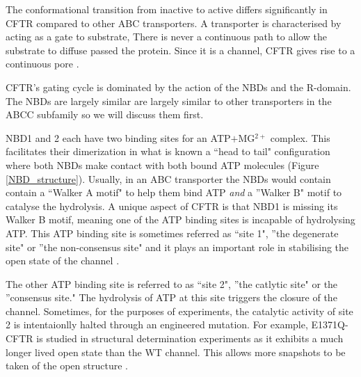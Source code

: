 The conformational transition from inactive to active differs significantly in CFTR compared to other ABC transporters. A transporter is characterised by acting as a gate to substrate, There is never a continuous path to allow the substrate to diffuse passed the protein. Since it is a channel, CFTR gives rise to a continuous pore \cite{linsdell2018}. 

CFTR's gating cycle is dominated by the action of the NBDs and the R-domain. The NBDs are largely similar are largely similar to other transporters in the ABCC subfamily so we will discuss them first. 

NBD1 and 2 each have two binding sites for an ATP$+$MG$^{2+}$ complex. This facilitates their dimerization in what is known a ``head to tail" configuration where both NBDs make contact with both bound ATP molecules \cite{gout2012}  (Figure \ref{NBD_structure}). Usually, in an ABC transporter the NBDs would contain contain a ``Walker A motif" to help them bind ATP \textit {and} a ''Walker B" motif to catalyse the hydrolysis. A unique aspect of CFTR is that NBD1 is missing its Walker B motif, meaning one of the ATP binding sites is incapable of hydrolysing ATP. This ATP binding site is sometimes referred as ``site 1", ''the degenerate site" or ''the non-consensus site" and it plays an important role in stabilising the open state of the channel \cite{yeh2022, csanady2019a}.

The other ATP binding site is referred to as ``site 2", ''the catlytic site" or the ''consensus site." The hydrolysis of ATP at this site triggers the closure of the channel. Sometimes, for the purposes of experiments, the catalytic activity of site 2 is intentaionlly halted through an engineered mutation. For example, E1371Q-CFTR is studied in structural determination experiments as it exhibits a much longer lived open state than the WT channel. This allows more snapshots to be taken of the open structure \cite{ramjeesingh1999, gout2012, muallem2009, hwang2013, zhang2018}. 

